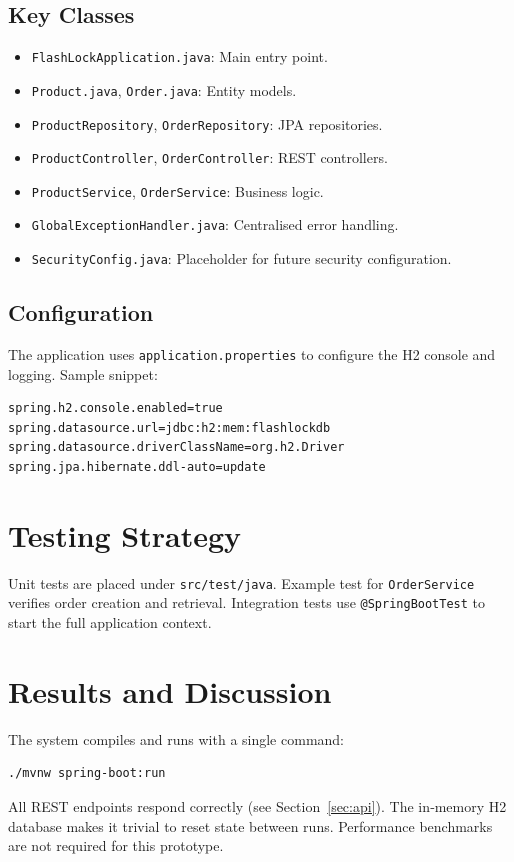 \documentclass[12pt,a4paper]{report}
\begin{document}
\section{Key Classes}
\begin{itemize}[noitemsep]
    \item \texttt{FlashLockApplication.java}: Main entry point.
    \item \texttt{Product.java}, \texttt{Order.java}: Entity models.
    \item \texttt{ProductRepository}, \texttt{OrderRepository}: JPA repositories.
    \item \texttt{ProductController}, \texttt{OrderController}: REST controllers.
    \item \texttt{ProductService}, \texttt{OrderService}: Business logic.
    \item \texttt{GlobalExceptionHandler.java}: Centralised error handling.
    \item \texttt{SecurityConfig.java}: Placeholder for future security configuration.
\end{itemize}

\section{Configuration}
The application uses \texttt{application.properties} to configure the H2 console and logging. Sample snippet:
\begin{verbatim}
spring.h2.console.enabled=true
spring.datasource.url=jdbc:h2:mem:flashlockdb
spring.datasource.driverClassName=org.h2.Driver
spring.jpa.hibernate.ddl-auto=update
\end{verbatim}

\chapter{Testing Strategy}
Unit tests are placed under \texttt{src/test/java}. Example test for \texttt{OrderService} verifies order creation and retrieval. Integration tests use \texttt{@SpringBootTest} to start the full application context.

\chapter{Results and Discussion}
The system compiles and runs with a single command:
\begin{verbatim}
./mvnw spring-boot:run
\end{verbatim}
All REST endpoints respond correctly (see Section~\ref{sec:api}). The in‑memory H2 database makes it trivial to reset state between runs. Performance benchmarks are not required for this prototype.
\end{document}
